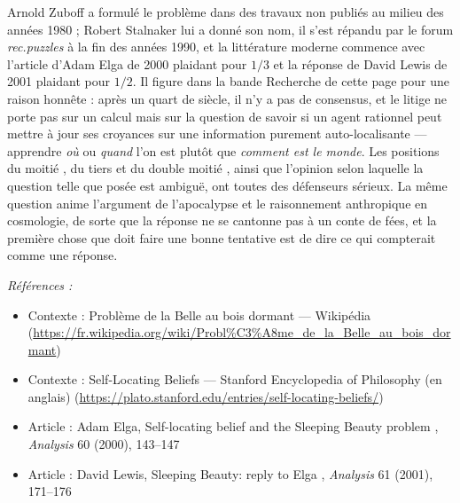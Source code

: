 \documentclass[11pt]{article}
\newenvironment{refs}{\par\small\noindent\emph{Références :}\begin{itemize}\setlength\itemsep{0pt}}{\end{itemize}\normalsize}
\begin{document}
\noindent Arnold Zuboff a formulé le problème dans des travaux non publiés au milieu
des années 1980 ; Robert Stalnaker lui a donné son nom, il s'est répandu par le forum
\textit{rec.puzzles} à la fin des années 1990, et la littérature moderne commence avec l'article
d'Adam Elga de 2000 plaidant pour $ 1/3 $ et la réponse de David Lewis de 2001 plaidant pour
$ 1/2 $. Il figure dans la bande Recherche de cette page pour une raison honnête : après un
quart de siècle, il n'y a pas de consensus, et le litige ne porte pas sur un calcul mais sur la
question de savoir si un agent rationnel peut mettre à jour ses croyances sur une information
purement auto-localisante --- apprendre \textit{où} ou \textit{quand} l'on est plutôt que \textit{comment
est le monde}. Les positions du \og{} moitié \fg{}, du \og{} tiers \fg{} et du \og{} double moitié \fg{}, ainsi que
l'opinion selon laquelle la question telle que posée est ambiguë, ont toutes des défenseurs
sérieux.
La même question anime l'argument de l'apocalypse et le raisonnement anthropique en
cosmologie, de sorte que la réponse ne se cantonne pas à un conte de fées, et la première
chose que doit faire une bonne tentative est de dire ce qui compterait comme une réponse.

\begin{refs}
\item Contexte : Problème de la Belle au bois dormant --- Wikipédia (\url{https://fr.wikipedia.org/wiki/Probl%C3%A8me_de_la_Belle_au_bois_dormant})
\item Contexte : Self-Locating Beliefs --- Stanford Encyclopedia of Philosophy (en anglais) (\url{https://plato.stanford.edu/entries/self-locating-beliefs/})
\item Article : Adam Elga, \og{} Self-locating belief and the Sleeping Beauty problem \fg{}, \textit{Analysis} 60 (2000), 143--147
\item Article : David Lewis, \og{} Sleeping Beauty: reply to Elga \fg{}, \textit{Analysis} 61 (2001), 171--176
\end{refs}

\bigskip
\end{document}
